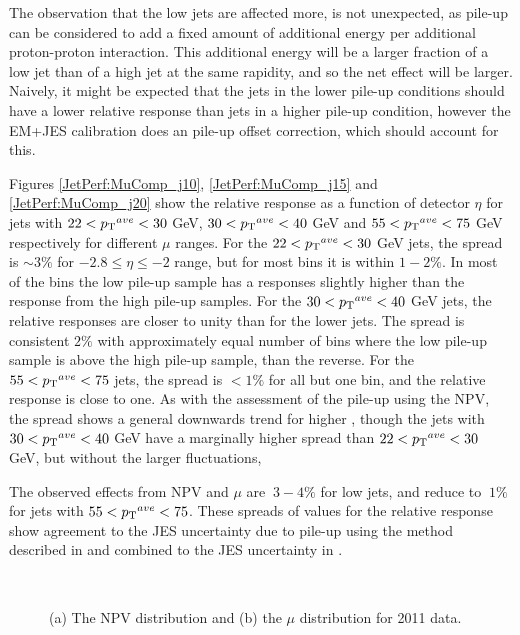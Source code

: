 The observation that the low \ptave{} jets are affected more, is not unexpected, as pile-up can be considered to add a fixed amount of additional energy per additional proton-proton interaction.
This additional energy will be a larger fraction of a low \pt{} jet than of a high \pt{} jet at the same rapidity, and so the net effect will be larger.
Naively, it might be expected that the jets in the lower pile-up conditions should have a lower relative response than jets in a higher pile-up condition, however the EM+JES calibration does an pile-up offset correction, which should account for this.


Figures \ref{JetPerf:MuComp_j10}, \ref{JetPerf:MuComp_j15} and \ref{JetPerf:MuComp_j20}  show the relative response as a function of detector $\eta$ for jets with $22<\mbox{$\mbox{$p_{\rm T}$}{}^{ave}$}{}<30$ GeV, $30<\mbox{$\mbox{$p_{\rm T}$}{}^{ave}$}{}<40$ GeV and $55<\mbox{$\mbox{$p_{\rm T}$}{}^{ave}$}{}<75$ GeV respectively for different $\mu$ ranges.
For the $22<\mbox{$\mbox{$p_{\rm T}$}{}^{ave}$}{}<30$ GeV jets, the spread  is $\sim 3\%$ for $-2.8\le\eta\le-2$ range, but for most bins it is within $ 1-2\%$.
In most of the bins the low pile-up sample has a responses slightly higher than the response from the high pile-up samples.
For the $30<\mbox{$\mbox{$p_{\rm T}$}{}^{ave}$}{}<40$ GeV jets, the relative responses are closer to unity than for the lower \ptave{} jets.
The spread is consistent $2\%$ with approximately equal number of bins where the low pile-up sample is above the high pile-up sample, than the reverse.
For the $55<\mbox{$\mbox{$p_{\rm T}$}{}^{ave}$}{}<75$ jets, the spread is $<1\%$ for all but one bin, and the relative response is close to one.  
As with the assessment of the pile-up using the NPV, the spread shows a general downwards trend for higher \ptave{}, though the jets with $30<\mbox{$\mbox{$p_{\rm T}$}{}^{ave}$}{}<40$ GeV have a marginally higher spread than $22<\mbox{$\mbox{$p_{\rm T}$}{}^{ave}$}{}<30$ GeV, but without the larger fluctuations,

The observed effects from NPV and $\mu$ are $~3-4\%$ for low \ptave{} jets, and reduce to $~1\%$ for jets with $55<\mbox{$\mbox{$p_{\rm T}$}{}^{ave}$}{}<75$.
These spreads of values for the relative response show agreement to the JES uncertainty due to pile-up using the method described in \cite{ref:Pileup} and combined to the JES uncertainty in \cite{ref:JES2011}.



\begin{figure}
\centering
\mbox{
              \quad
              \quad
                              }
\caption[Number of primary vertices and $\mu{}$ for 2011 data]{
(a) The NPV distribution and (b) the $\mu$ distribution for 2011 data.
\label{JetPerf:NPV_Mu}}
\end{figure}



